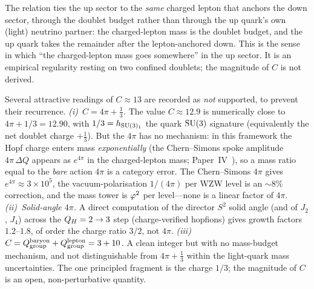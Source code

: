 \begin{remark}
\label{P20:rem:sumrule_scope}
The relation ties the up sector to the \emph{same} charged lepton that
anchors the down sector, through the doublet budget rather than through
the up quark's own (light) neutrino partner: the charged-lepton mass is
the doublet budget, and the up quark takes the remainder after the
lepton-anchored down. This is the sense in which ``the charged-lepton
mass goes somewhere'' in the up sector. It is an empirical regularity
resting on two confined doublets; the magnitude of $C$ is not derived.
\end{remark}

\begin{remark}
\label{P20:rem:C_retractions}
Several attractive readings of $C\approx13$ are recorded as \emph{not}
supported, to prevent their recurrence.
\emph{(i)~$C=4\pi+\tfrac13$.} The value $C\approx12.9$ is numerically
close to $4\pi+1/3=12.90$, with $1/3=h_{\mathrm{SU}(3)_1}$ the quark
$\mathrm{SU}(3)$ signature (equivalently the net doublet charge $+\tfrac13$).
But the $4\pi$ has no mechanism: in this framework the Hopf charge
enters mass \emph{exponentially} (the Chern--Simons spoke amplitude
$4\pi\,\Delta Q$ appears as $e^{4\pi}$ in the charged-lepton mass;
Paper~IV~\cite{Paper4}), so a mass ratio equal to the \emph{bare}
action $4\pi$ is a category error. The Chern--Simons $4\pi$ gives
$e^{4\pi}\approx3\times10^5$, the vacuum-polarisation $1/(4\pi)$ per
WZW level is an $\sim8\%$ correction, and the mass tower is $\varphi^2$ per
level---none is a linear factor of $4\pi$.
\emph{(ii)~Solid-angle $4\pi$.} A direct computation of the director
$S^2$ solid angle (and of $J_2$, $J_4$) across the $Q_H=2\to3$ step
(charge-verified hopfions) gives growth factors $1.2$--$1.8$, of order
the charge ratio $3/2$, not $4\pi$.
\emph{(iii)~$C=Q_{\mathrm{group}}^{\rm baryon}+Q_{\mathrm{group}}^{\rm lepton}=3+10$.} A clean
integer but with no mass-budget mechanism, and not distinguishable from
$4\pi+\tfrac13$ within the light-quark mass uncertainties.
The one principled fragment is the charge $1/3$; the magnitude of $C$
is an open, non-perturbative quantity.
\end{remark}

